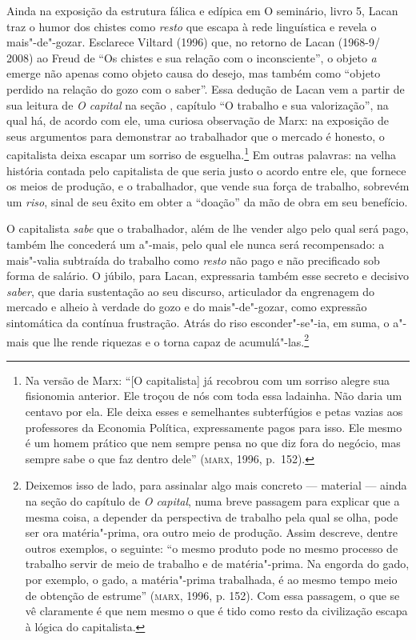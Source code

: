 Ainda na exposição da estrutura fálica e edípica em O seminário, livro
5, Lacan traz o humor dos chistes como \emph{resto} que escapa à rede
linguística e revela o mais"-de"-gozar. Esclarece Viltard (1996) que, no
retorno de Lacan (1968-9/ 2008) ao Freud de ``Os chistes e sua relação
com o inconsciente'', o objeto \emph{a} emerge não apenas como objeto
causa do desejo, mas também como ``objeto perdido na relação do gozo com
o saber''. Essa dedução de Lacan vem a partir de sua leitura de \emph{O
capital} na seção , capítulo  ``O trabalho e sua valorização'', na
qual há, de acordo com ele, uma curiosa observação de Marx: na exposição
de seus argumentos para demonstrar ao trabalhador que o mercado é
honesto, o capitalista deixa escapar um sorriso de esguelha.\footnote{Na
  versão de Marx: ``{[}O capitalista{]} já recobrou com um sorriso
  alegre sua fisionomia anterior. Ele troçou de nós com toda essa
  ladainha. Não daria um centavo por ela. Ele deixa esses e semelhantes
  subterfúgios e petas vazias aos professores da Economia Política,
  expressamente pagos para isso. Ele mesmo é um homem prático que nem
  sempre pensa no que diz fora do negócio, mas sempre sabe o que faz
  dentro dele'' (\textsc{marx}, 1996, p.~152).} Em outras palavras: na
velha história contada pelo capitalista de que seria justo o acordo
entre ele, que fornece os meios de produção, e o trabalhador, que vende
sua força de trabalho, sobrevém um \emph{riso}, sinal de seu êxito em
obter a ``doação'' da mão de obra em seu benefício.

O capitalista \emph{sabe} que o trabalhador, além de lhe vender algo
pelo qual será pago, também lhe concederá um a"-mais, pelo qual ele nunca
será recompensado: a mais"-valia subtraída do trabalho como \emph{resto}
não pago e não precificado sob forma de salário. O júbilo, para Lacan,
expressaria também esse secreto e decisivo \emph{saber}, que daria
sustentação ao seu discurso, articulador da engrenagem do mercado e
alheio à verdade do gozo e do mais"-de"-gozar, como expressão sintomática
da contínua frustração. Atrás do riso esconder"-se"-ia, em suma, o a"-mais
que lhe rende riquezas e o torna capaz de acumulá"-las.\footnote{Deixemos
  isso de lado, para assinalar algo mais concreto --- material --- ainda
  na seção  do capítulo  de \emph{O capital}, numa breve passagem
  para explicar que a mesma coisa, a depender da perspectiva de trabalho
  pela qual se olha, pode ser ora matéria"-prima, ora outro meio de
  produção. Assim descreve, dentre outros exemplos, o seguinte: ``o
  mesmo produto pode no mesmo processo de trabalho servir de meio de
  trabalho e de matéria"-prima. Na engorda do gado, por exemplo, o gado,
  a matéria"-prima trabalhada, é ao mesmo tempo meio de obtenção de
  estrume'' (\textsc{marx}, 1996, p. 152). Com essa passagem, o que se vê
  claramente é que nem mesmo o que é tido como resto da civilização
  escapa à lógica do capitalista.}

